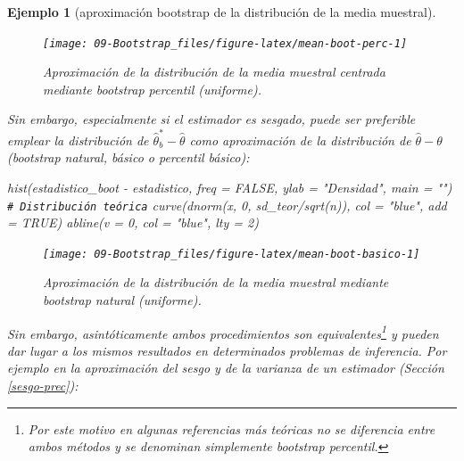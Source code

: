 \documentclass[
]{book}
\newenvironment{Shaded}{\begin{snugshade}}{\end{snugshade}}
\newcommand{\AttributeTok}[1]{\textcolor[rgb]{0.77,0.63,0.00}{#1}}
\newcommand{\CommentTok}[1]{\textcolor[rgb]{0.56,0.35,0.01}{\textit{#1}}}
\newcommand{\ConstantTok}[1]{\textcolor[rgb]{0.00,0.00,0.00}{#1}}
\newcommand{\DecValTok}[1]{\textcolor[rgb]{0.00,0.00,0.81}{#1}}
\newcommand{\FunctionTok}[1]{\textcolor[rgb]{0.00,0.00,0.00}{#1}}
\newcommand{\NormalTok}[1]{#1}
\newcommand{\SpecialCharTok}[1]{\textcolor[rgb]{0.00,0.00,0.00}{#1}}
\newcommand{\StringTok}[1]{\textcolor[rgb]{0.31,0.60,0.02}{#1}}
\theoremstyle{break}
\newtheorem{example}{Ejemplo}[chapter]
\theoremstyle{nonumberplain}
\renewcommand{\CommentTok}[1]{\textcolor[rgb]{0.41,0.41,0.41}{\texttt{#1}}}
\begin{document}
\begin{example}[aproximación bootstrap de la distribución de la media muestral]
\begin{figure}[!htb]

{\centering \texttt{[image: 09-Bootstrap\_files/figure-latex/mean-boot-perc-1]} 

}

\caption{Aproximación de la distribución de la media muestral centrada mediante bootstrap percentil (uniforme).}\label{fig:mean-boot-perc}
\end{figure}

Sin embargo, especialmente si el estimador es sesgado, puede ser preferible emplear la distribución de \(\hat{\theta}_{b}^{\ast }-\hat{\theta}\) como aproximación de la distribución de \(\hat{\theta}-\theta\) (bootstrap natural, básico o percentil básico):

\begin{Shaded}
\begin{Highlighting}[]
\FunctionTok{hist}\NormalTok{(estadistico\_boot }\SpecialCharTok{{-}}\NormalTok{ estadistico, }\AttributeTok{freq =} \ConstantTok{FALSE}\NormalTok{, }
     \AttributeTok{ylab =} \StringTok{"Densidad"}\NormalTok{, }\AttributeTok{main =} \StringTok{""}\NormalTok{)}
\CommentTok{\# Distribución teórica}
\FunctionTok{curve}\NormalTok{(}\FunctionTok{dnorm}\NormalTok{(x, }\DecValTok{0}\NormalTok{, sd\_teor}\SpecialCharTok{/}\FunctionTok{sqrt}\NormalTok{(n)), }\AttributeTok{col =} \StringTok{"blue"}\NormalTok{, }\AttributeTok{add =} \ConstantTok{TRUE}\NormalTok{)}
\FunctionTok{abline}\NormalTok{(}\AttributeTok{v =} \DecValTok{0}\NormalTok{, }\AttributeTok{col =} \StringTok{"blue"}\NormalTok{, }\AttributeTok{lty =} \DecValTok{2}\NormalTok{)}
\end{Highlighting}
\end{Shaded}

\begin{figure}[!htb]

{\centering \texttt{[image: 09-Bootstrap\_files/figure-latex/mean-boot-basico-1]} 

}

\caption{Aproximación de la distribución de la media muestral mediante bootstrap natural (uniforme).}\label{fig:mean-boot-basico}
\end{figure}

Sin embargo, asintóticamente ambos procedimientos son equivalentes\footnote{Por este motivo en algunas referencias más teóricas no se diferencia entre ambos métodos y se denominan simplemente bootstrap percentil.} y pueden dar lugar a los mismos resultados en determinados problemas de inferencia.
Por ejemplo en la aproximación del sesgo y de la varianza de un estimador (Sección \ref{sesgo-prec}):


\end{example}
\end{document}
